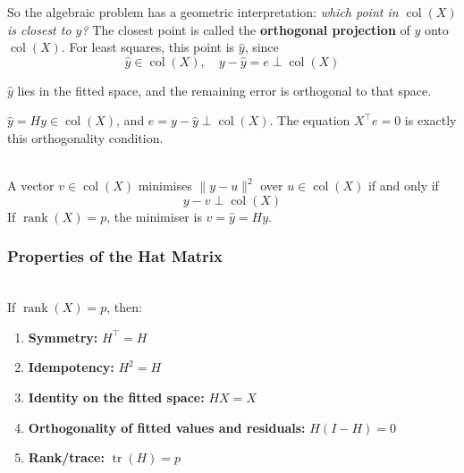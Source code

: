So the algebraic problem has a geometric interpretation: \textit{which point in $\operatorname{col}(X)$ is closest to $y$?} The closest point is called the \textbf{orthogonal projection} of $y$ onto $\operatorname{col}(X)$. For least squares, this point is $\hat{y}$, since
\begin{equation*}
    \hat{y} \in \operatorname{col}(X), \quad y - \hat{y} = e \perp \operatorname{col}(X)
\end{equation*}

$\hat y$ lies in the fitted space, and the remaining error is orthogonal to that space.

$\hat y = Hy \in \operatorname{col}(X)$, and $e = y - \hat y \perp \operatorname{col}(X)$. The equation $X^\top e = 0$ is exactly this orthogonality condition.

\begin{theorem} \leavevmode\\
    A vector $v \in \operatorname{col}(X)$ minimises $\lVert y - u \rVert^2$ over $u \in \operatorname{col}(X)$ if and only if
    \begin{equation*}
        y - v \perp \operatorname{col}(X)
    \end{equation*}
    If $\operatorname{rank}(X) = p$, the minimiser is $v = \hat y = Hy$.
\end{theorem}

\subsubsection{Properties of the Hat Matrix}
\begin{proposition} \leavevmode\\
    If $\operatorname{rank}(X) = p$, then:
    \begin{enumerate}
        \item \textbf{Symmetry:} $H^\top = H$
        \item \textbf{Idempotency:} $H^2 = H$
        \item \textbf{Identity on the fitted space:} $HX = X$
        \item \textbf{Orthogonality of fitted values and residuals:} $H(I-H) = 0$
        \item \textbf{Rank/trace:} $\operatorname{tr}(H) = p$
    \end{enumerate}
\end{proposition}

